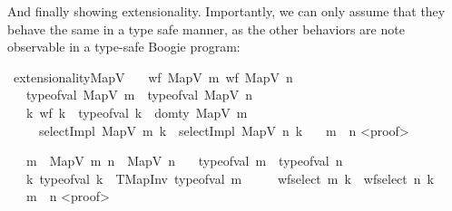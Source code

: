 And finally showing extensionality.
Importantly, we can only assume that they behave the same in a type safe manner,
as the other behaviors are note observable in a type-safe Boogie program:
\begin{isabellebody}
\isamarkupfalse%
\ extensionalityMapV{\isacharcolon}{\kern0pt}\isanewline
\ \ \ {\isachardoublequoteopen}wf\ {\isacharparenleft}{\kern0pt}MapV\ m{\isacharparenright}{\kern0pt}{\isachardoublequoteclose}\ {\isachardoublequoteopen}wf\ {\isacharparenleft}{\kern0pt}MapV\ n{\isacharparenright}{\kern0pt}{\isachardoublequoteclose}\isanewline
\ \ \ {\isachardoublequoteopen}type{\isacharunderscore}{\kern0pt}of{\isacharunderscore}{\kern0pt}val\ {\isacharparenleft}{\kern0pt}MapV\ m{\isacharparenright}{\kern0pt}\ {\isacharequal}{\kern0pt}\ type{\isacharunderscore}{\kern0pt}of{\isacharunderscore}{\kern0pt}val\ {\isacharparenleft}{\kern0pt}MapV\ n{\isacharparenright}{\kern0pt}{\isachardoublequoteclose}\isanewline
\ \ \ {\isachardoublequoteopen}{\isasymforall}k{\isachardot}{\kern0pt}\ {\isacharparenleft}{\kern0pt}wf\ k\ {\isasymand}\ type{\isacharunderscore}{\kern0pt}of{\isacharunderscore}{\kern0pt}val\ k\ {\isacharequal}{\kern0pt}\ dom{\isacharunderscore}{\kern0pt}ty\ {\isacharparenleft}{\kern0pt}MapV\ m{\isacharparenright}{\kern0pt}{\isacharparenright}{\kern0pt}\isanewline
\ \ \ \ {\isasymlongrightarrow}\ selectImpl\ {\isacharparenleft}{\kern0pt}MapV\ m{\isacharparenright}{\kern0pt}\ k\ {\isacharequal}{\kern0pt}\ selectImpl\ {\isacharparenleft}{\kern0pt}MapV\ n{\isacharparenright}{\kern0pt}\ k{\isachardoublequoteclose}\isanewline
\ \ \ {\isachardoublequoteopen}m\ {\isacharequal}{\kern0pt}\ n{\isachardoublequoteclose}\isanewline
<proof>\isanewline

\isamarkupfalse\isanewline
\ \ \ {\isachardoublequoteopen}m\ {\isacharequal}{\kern0pt}\ MapV\ m{\isacharprime}{\kern0pt}{\isachardoublequoteclose}\ {\isachardoublequoteopen}n\ {\isacharequal}{\kern0pt}\ MapV\ n{\isacharprime}{\kern0pt}{\isachardoublequoteclose}\isanewline
\ \ \ {\isachardoublequoteopen}type{\isacharunderscore}{\kern0pt}of{\isacharunderscore}{\kern0pt}val\ m\ {\isacharequal}{\kern0pt}\ type{\isacharunderscore}{\kern0pt}of{\isacharunderscore}{\kern0pt}val\ n{\isachardoublequoteclose}\isanewline
\ \ \ {\isachardoublequoteopen}{\isasymforall}k{\isachardot}{\kern0pt}\ type{\isacharunderscore}{\kern0pt}of{\isacharunderscore}{\kern0pt}val\ k\ {\isacharequal}{\kern0pt}\ TMapInv{}\ {\isacharparenleft}{\kern0pt}type{\isacharunderscore}{\kern0pt}of{\isacharunderscore}{\kern0pt}val\ m{\isacharparenright}{\kern0pt}\isanewline
\ \ \ \ {\isasymlongrightarrow}\ wf{\isacharunderscore}{\kern0pt}select\ m\ k\ {\isacharequal}{\kern0pt}\ wf{\isacharunderscore}{\kern0pt}select\ n\ k{\isachardoublequoteclose}\isanewline
\ \ \ {\isachardoublequoteopen}m\ {\isacharequal}{\kern0pt}\ n{\isachardoublequoteclose}\isanewline
<proof>\isanewline
\end{isabellebody}


